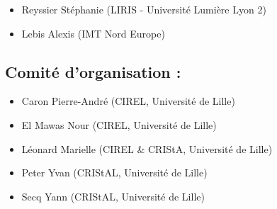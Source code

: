 \begin{itemize}
	\item[] Reyssier Stéphanie (LIRIS - Université Lumière Lyon 2)
	\item[] Lebis Alexis (IMT Nord Europe)
\end{itemize}

\subsection*{Comité d'organisation :}

\begin{itemize}
	\item[] Caron Pierre-André (CIREL, Université de Lille)
	\item[] El Mawas Nour (CIREL, Université de Lille)
	\item[] Léonard Marielle (CIREL \& CRIStA, Université de Lille)
	\item[] Peter Yvan (CRIStAL, Université de Lille)
	\item[] Secq Yann (CRIStAL, Université de Lille)
\end{itemize}